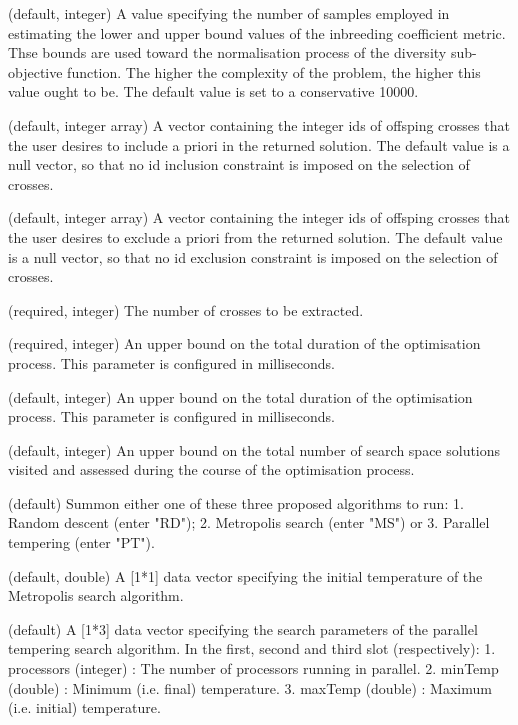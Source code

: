 \documentclass[a4paper]{book}
\begin{document}
\begin{Arguments}
\begin{ldescription}
\item[\code{inbreedingCoefficientBoundsEstimatorSampleSize}] (default, integer) A value specifying the number of samples employed in estimating the lower and upper bound values of the inbreeding coefficient metric.
Thse bounds are used toward the normalisation process of the diversity sub-objective function.
The higher the complexity of the problem, the higher this value ought to be.
The default value is set to a conservative 10000.

\item[\code{inclusionSet}] (default, integer array) A vector containing the integer ids of offsping crosses that the user desires to include a priori in the returned solution.
The default value is a null vector, so that no id inclusion constraint is imposed on the selection of crosses.

\item[\code{exclusionSet}] (default, integer array) A vector containing the integer ids of offsping crosses that the user desires to exclude a priori from the returned solution.
The default value is a null vector, so that no id exclusion constraint is imposed on the selection of crosses.

\item[\code{solutionSize}] (required, integer) The number of crosses to be extracted.

\item[\code{maximumSearchTime}] (required, integer) An upper bound on the total duration of the optimisation process.
This parameter is configured in milliseconds.

\item[\code{timeWithoutImprovement}] (default, integer) An upper bound on the total duration of the optimisation process.
This parameter is configured in milliseconds.

\item[\code{maximumNumberMoves}] (default, integer) An upper bound on the total number of search space solutions visited and assessed during the course of the optimisation process.

\item[\code{searchMethod}] (default) Summon either one of these three proposed algorithms to run: 
1. Random descent (enter "RD"); 
2. Metropolis search (enter "MS") or 
3. Parallel  tempering (enter "PT").

\item[\code{searchParametersMS}] (default, double) A [1*1] data vector specifying the initial temperature of the Metropolis search algorithm.

\item[\code{searchParametersPT}] (default) A [1*3] data vector specifying the search parameters of the parallel tempering search algorithm.
In the first, second and third slot (respectively):
1. processors (integer) : The number of processors running in parallel.
2. minTemp (double) : Minimum (i.e. final) temperature.
3. maxTemp (double) : Maximum (i.e. initial) temperature.
\end{ldescription}
\end{Arguments}
\end{document}
